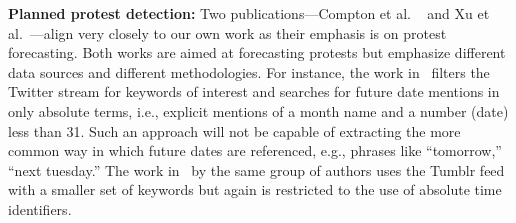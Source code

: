 {\bf Planned protest detection:}
Two publications---Compton et al. ~\cite{compton2013detecting} and Xu et al.~\cite{xu2014civil}---align very closely to our own work as their emphasis is on protest forecasting.
Both works are aimed at forecasting protests
but emphasize different data sources and different methodologies. For instance, the work in~\cite{compton2013detecting} filters the Twitter stream for
keywords of interest and searches for future date mentions in only absolute terms, i.e., explicit mentions of a month name and a number (date)
less than 31. 
Such an approach will not be capable of extracting the more
common way in which future dates are referenced, e.g., phrases like
``tomorrow,'' ``next tuesday.'' 
The work in~\cite{xu2014civil} by the same group of authors uses the Tumblr feed with a smaller set of keywords but
again is restricted to the use of absolute time identifiers.

\iffalse
In surveying the state-of-the-art, we arrived at desiderata for a planned protest forecasting system. As shown in 
we desire a system that is capable of: i) ingesting a broad range of data sources from both popular news and social media,
ii) learning relevant phrases for tracking protests, 
iii) handling relative mentions of dates, and
iv) providing a rich representational and reasoning basis for location. 
As Table~\ref{comp-table} summarizes, current systems provide only partial solutions and the proposed
approach addresses all four desired criteria.
\fi
